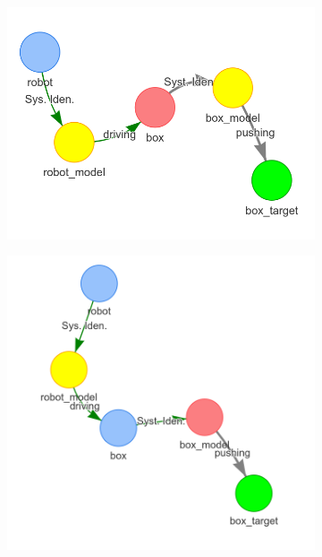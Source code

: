 \begin{figure}[H]
    \centering
    \begin{subfigure}{.3\textwidth}
    \centering
    \includegraphics[width=1.05\textwidth]{figures/proposed_method/connecting_nodes/robot_push/robot_push_5}
    \caption{}\label{subfig:robot_push_5}
    \end{subfigure}
    \begin{subfigure}{.3\textwidth}
    \centering
    \includegraphics[width=1.05\textwidth]{figures/proposed_method/connecting_nodes/robot_push/robot_push_6}
    \caption{}\label{subfig:robot_push_6}
    \end{subfigure}


\end{figure}
